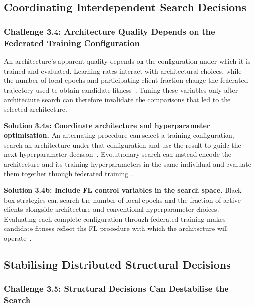 \subsection{Coordinating Interdependent Search Decisions}

\subsubsection{Challenge 3.4: Architecture Quality Depends on the Federated Training Configuration}

An architecture's apparent quality depends on the configuration under which it is trained and evaluated. Learning rates interact with architectural choices, while the number of local epochs and participating-client fraction change the federated trajectory used to obtain candidate fitness~\cite{feathers_2023,aging_fednas_2025,breastcancer_fednas_2024}. Tuning these variables only after architecture search can therefore invalidate the comparisons that led to the selected architecture.

\noindent\textbf{Solution 3.4a: Coordinate architecture and hyperparameter optimisation.} An alternating procedure can select a training configuration, search an architecture under that configuration and use the result to guide the next hyperparameter decision~\cite{feathers_2023}. Evolutionary search can instead encode the architecture and its training hyperparameters in the same individual and evaluate them together through federated training~\cite{aging_fednas_2025}.

\noindent\textbf{Solution 3.4b: Include FL control variables in the search space.} Black-box strategies can search the number of local epochs and the fraction of active clients alongside architecture and conventional hyperparameter choices. Evaluating each complete configuration through federated training makes candidate fitness reflect the FL procedure with which the architecture will operate~\cite{breastcancer_fednas_2024}.

\subsection{Stabilising Distributed Structural Decisions}

\subsubsection{Challenge 3.5: Structural Decisions Can Destabilise the Search}

